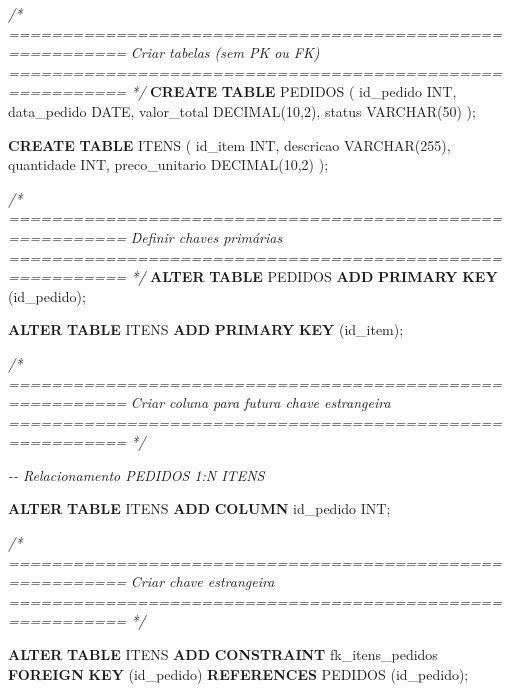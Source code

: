 \documentclass[
]{book}
\newenvironment{Shaded}{\begin{snugshade}}{\end{snugshade}}
\newcommand{\CommentTok}[1]{\textcolor[rgb]{0.56,0.35,0.01}{\textit{#1}}}
\newcommand{\DataTypeTok}[1]{\textcolor[rgb]{0.13,0.29,0.53}{#1}}
\newcommand{\DecValTok}[1]{\textcolor[rgb]{0.00,0.00,0.81}{#1}}
\newcommand{\KeywordTok}[1]{\textcolor[rgb]{0.13,0.29,0.53}{\textbf{#1}}}
\newcommand{\NormalTok}[1]{#1}
\begin{document}
\begin{Shaded}
\begin{Highlighting}[]
\CommentTok{/* =========================================================}
\CommentTok{   Criar tabelas (sem PK ou FK)}
\CommentTok{   ========================================================= */}
\KeywordTok{CREATE} \KeywordTok{TABLE}\NormalTok{ PEDIDOS }
\NormalTok{(}
\NormalTok{    id\_pedido }\DataTypeTok{INT}\NormalTok{,}
\NormalTok{    data\_pedido }\DataTypeTok{DATE}\NormalTok{,}
\NormalTok{    valor\_total }\DataTypeTok{DECIMAL}\NormalTok{(}\DecValTok{10}\NormalTok{,}\DecValTok{2}\NormalTok{),}
\NormalTok{    status }\DataTypeTok{VARCHAR}\NormalTok{(}\DecValTok{50}\NormalTok{)}
\NormalTok{);}

\KeywordTok{CREATE} \KeywordTok{TABLE}\NormalTok{ ITENS }
\NormalTok{(}
\NormalTok{    id\_item }\DataTypeTok{INT}\NormalTok{,}
\NormalTok{    descricao }\DataTypeTok{VARCHAR}\NormalTok{(}\DecValTok{255}\NormalTok{),}
\NormalTok{    quantidade }\DataTypeTok{INT}\NormalTok{,}
\NormalTok{    preco\_unitario }\DataTypeTok{DECIMAL}\NormalTok{(}\DecValTok{10}\NormalTok{,}\DecValTok{2}\NormalTok{)}
\NormalTok{);}

\CommentTok{/* =========================================================}
\CommentTok{   Definir chaves primárias}
\CommentTok{   ========================================================= */}
\KeywordTok{ALTER} \KeywordTok{TABLE}\NormalTok{ PEDIDOS }\KeywordTok{ADD} \KeywordTok{PRIMARY} \KeywordTok{KEY}\NormalTok{ (id\_pedido);}

\KeywordTok{ALTER} \KeywordTok{TABLE}\NormalTok{ ITENS }\KeywordTok{ADD} \KeywordTok{PRIMARY} \KeywordTok{KEY}\NormalTok{ (id\_item);}

\CommentTok{/* =========================================================}
\CommentTok{   Criar coluna para futura chave estrangeira}
\CommentTok{   ========================================================= */}

\CommentTok{{-}{-} Relacionamento PEDIDOS 1:N ITENS}

\KeywordTok{ALTER} \KeywordTok{TABLE}\NormalTok{ ITENS }\KeywordTok{ADD} \KeywordTok{COLUMN}\NormalTok{ id\_pedido }\DataTypeTok{INT}\NormalTok{;}

\CommentTok{/* =========================================================}
\CommentTok{   Criar chave estrangeira}
\CommentTok{   ========================================================= */}

\KeywordTok{ALTER} \KeywordTok{TABLE}\NormalTok{ ITENS }\KeywordTok{ADD} \KeywordTok{CONSTRAINT}\NormalTok{ fk\_itens\_pedidos }\KeywordTok{FOREIGN} \KeywordTok{KEY}\NormalTok{ (id\_pedido) }\KeywordTok{REFERENCES}\NormalTok{ PEDIDOS (id\_pedido);}
\end{Highlighting}
\end{Shaded}
\end{document}
